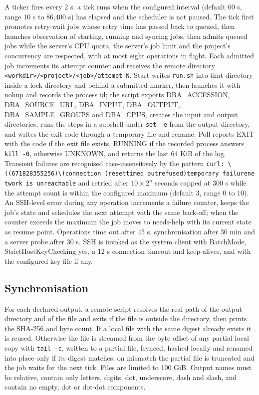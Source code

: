\documentclass[11pt,a4paper]{article}
\begin{document}
A ticker fires every 2 s; a tick runs when the configured interval
(default 60 s, range 10 s to 86,400 s) has elapsed and the scheduler is
not paused. The tick first promotes retry-wait jobs whose retry time has
passed back to queued, then launches observation of starting, running
and syncing jobs, then admits queued jobs while the server's CPU quota,
the server's job limit and the project's concurrency are respected, with
at most eight operations in flight. Each admitted job increments its
attempt counter and receives the remote directory
\texttt{\textless{}workdir\textgreater{}/\textless{}project\textgreater{}/\textless{}job\textgreater{}/attempt-N}.
Start writes \texttt{run.sh} into that directory inside a lock directory
and behind a submitted marker, then launches it with nohup and records
the process id; the script exports DBA\_ACCESSION, DBA\_SOURCE\_URL,
DBA\_INPUT, DBA\_OUTPUT, DBA\_SAMPLE\_GROUPS and DBA\_CPUS, creates the
input and output directories, runs the steps in a subshell under
\texttt{set\ -e} from the output directory, and writes the exit code
through a temporary file and rename. Poll reports EXIT with the code if
the exit file exists, RUNNING if the recorded process answers
\texttt{kill\ -0}, otherwise UNKNOWN, and returns the last 64 KiB of the
log. Transient failures are recognised case-insensitively by the pattern
\texttt{curl:\ \textbackslash{}((6\textbar{}7\textbar{}18\textbar{}28\textbar{}35\textbar{}52\textbar{}56)\textbackslash{})\textbar{}connection\ (reset\textbar{}timed\ out\textbar{}refused)\textbar{}temporary\ failure\textbar{}network\ is\ unreachable}
and retried after \(10 \times 2^{n}\) seconds capped at 300 s while the
attempt count is within the configured maximum (default 3, range 0 to
10). An SSH-level error during any operation increments a failure
counter, keeps the job's state and schedules the next attempt with the
same back-off; when the counter exceeds the maximum the job moves to
needs-help with its current state as resume point. Operations time out
after 45 s, synchronisation after 30 min and a server probe after 30 s.
SSH is invoked as the system client with BatchMode,
StrictHostKeyChecking yes, a 12 s connection timeout and keep-alives,
and with the configured key file if any.

\subsection{Synchronisation}\label{synchronisation}

For each declared output, a remote script resolves the real path of the
output directory and of the file and exits if the file is outside the
directory, then prints the SHA-256 and byte count. If a local file with
the same digest already exists it is reused. Otherwise the file is
streamed from the byte offset of any partial local copy with
\texttt{tail\ -c}, written to a partial file, fsynced, hashed locally
and renamed into place only if its digest matches; on mismatch the
partial file is truncated and the job waits for the next tick. Files are
limited to 100 GiB. Output names must be relative, contain only letters,
digits, dot, underscore, dash and slash, and contain no empty, dot or
dot-dot components.
\end{document}
